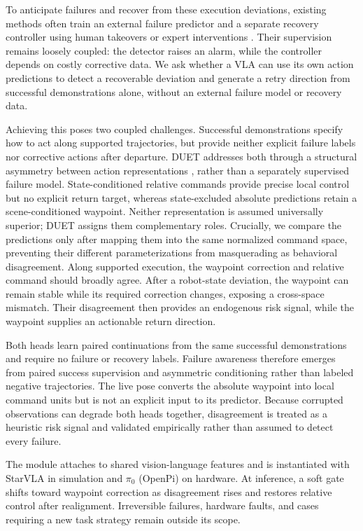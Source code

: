\documentclass[letterpaper, 10 pt, conference]{ieeeconf}
\begin{document}
To anticipate failures and recover from these execution deviations, existing methods often train an external failure predictor \cite{faildetect} and a separate recovery controller using human takeovers or expert interventions \cite{dagger,sirius,intervengen}. Their supervision remains loosely coupled: the detector raises an alarm, while the controller depends on costly corrective data. We ask whether a VLA can use its own action predictions to detect a recoverable deviation and generate a retry direction from successful demonstrations alone, without an external failure model or recovery data.

Achieving this poses two coupled challenges. Successful demonstrations specify how to act along supported trajectories, but provide neither explicit failure labels nor corrective actions after departure. DUET addresses both through a structural asymmetry between action representations \cite{aljalbout2024actionspace,feng2026demystifying}, rather than a separately supervised failure model. State-conditioned relative commands provide precise local control but no explicit return target, whereas state-excluded absolute predictions retain a scene-conditioned waypoint. Neither representation is assumed universally superior; DUET assigns them complementary roles. Crucially, we compare the predictions only after mapping them into the same normalized command space, preventing their different parameterizations from masquerading as behavioral disagreement. Along supported execution, the waypoint correction and relative command should broadly agree. After a robot-state deviation, the waypoint can remain stable while its required correction changes, exposing a cross-space mismatch. Their disagreement then provides an endogenous risk signal, while the waypoint supplies an actionable return direction.

Both heads learn paired continuations from the same successful demonstrations and require no failure or recovery labels. Failure awareness therefore emerges from paired success supervision and asymmetric conditioning rather than labeled negative trajectories. The live pose converts the absolute waypoint into local command units but is not an explicit input to its predictor. Because corrupted observations can degrade both heads together, disagreement is treated as a heuristic risk signal and validated empirically rather than assumed to detect every failure.

The module attaches to shared vision-language features and is instantiated with StarVLA \cite{starvla} in simulation and $\pi_0$ (OpenPi) \cite{pi0} on hardware. At inference, a soft gate shifts toward waypoint correction as disagreement rises and restores relative control after realignment. Irreversible failures, hardware faults, and cases requiring a new task strategy remain outside its scope.
\end{document}
